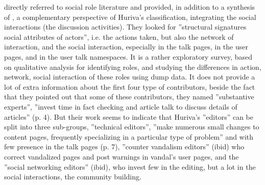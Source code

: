 \citet{Welseretal11} directly referred to social role literature
and provided, in addition to a synthesis of \citet{Harreretal08,Halatchliyskietal10,Ibaetal10},
a complementary perspective of Huriva's classification, integrating
the social interactions (the discussion activities). They looked for
''structural signatures social attributes of actors'', i.e. the
actions taken, but also the network of interaction, and the social
interaction, especially in the talk pages, in the user pages, and
in the user talk namespaces. It is a rather exploratory survey, based
on qualitative analysis for identifying roles, and studying the differences
in action, network, social interaction of these roles using dump data.
It does not provide a lot of extra information about the first four
type of contributors, beside the fact that they pointed out that some
of these contributors, they named ''substantive experts'', ''invest
time in fact checking and article talk to discuss details of articles''
(p. 4). But their work seems to indicate that Huriva's ''editors''
can be split into three sub-groups, ''technical editors'', ''make
numerous small changes to content pages, frequently specializing in
a particular type of problem'' and with few presence in the talk
pages (p. 7), ''counter vandalism editors'' (ibid) who correct vandalized
pages and post warnings in vandal's user pages, and the ''social
networking editors'' (ibid), who invest few in the editing, but a
lot in the social interactions, the community building. 


